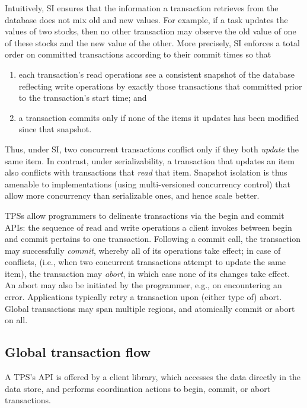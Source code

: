 Intuitively, SI ensures that the information a transaction retrieves from the database 
does not mix old and new values. For example, if a task updates the values of two stocks, then no other transaction may observe the old value of one of these stocks and the new value of the other. 
%
More precisely, SI enforces a total order on committed transactions according to their commit times so that 
\begin{enumerate}
    \setlength{\itemsep}{0pt}
    \setlength{\parskip}{0pt}
    \setlength{\parsep}{2pt}  
\item
each transaction's read operations see a consistent snapshot of the database reflecting write operations by
 exactly those transactions that committed prior to the transaction's start time; and 
\item
 a transaction commits only if none of the items it updates has been modified since that snapshot.
 \end{enumerate}
Thus, under SI, two concurrent transactions conflict only if they both \emph{update} the same item.  
In contrast, under serializability, a transaction that updates an item also conflicts with transactions that \emph{read} that item. Snapshot isolation is thus amenable to implementations (using multi-versioned concurrency control) that 
allow more concurrency than serializable ones, and hence scale better.

TPSs allow programmers to  delineate transactions via the begin and commit APIs: 
the sequence of read and write operations a client invokes between begin and  commit pertains to one transaction.
Following a commit call, the transaction may successfully \emph{commit}, whereby all of its operations take effect;
in case of conflicts, (i.e., when two concurrent transactions attempt to update the same item), the transaction may
\emph{abort}, in which case none of its changes take effect. An abort may also be initiated by the programmer, e.g., 
on encountering an error. Applications typically retry a transaction upon (either type of) abort. 
Global transactions may span multiple regions, and atomically commit or abort on all. 

\subsection{Global transaction flow} \label{ssec:global-transactions}

A TPS's API is offered by a client library, which accesses the data directly in the data store, and 
performs coordination actions to begin, commit, or abort transactions. 

